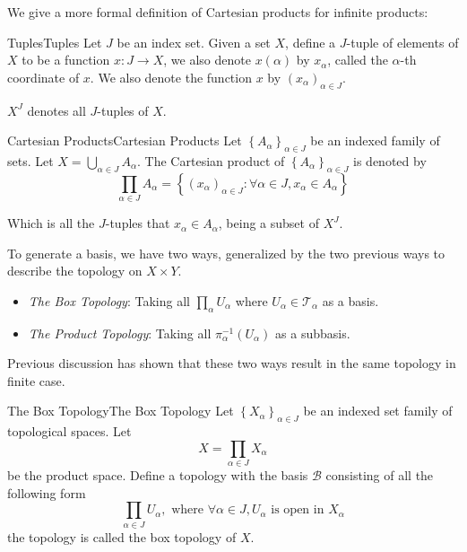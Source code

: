 \documentclass[../main.tex]{subfiles}
\begin{document}
We give a more formal definition of Cartesian products for infinite products:
\begin{definition}{Tuples}{Tuples}
Let $J$ be an index set. Given a set $X$, define a $J$-tuple of elements of $X$ to be a function $x:J \rightarrow X$, we also denote $x(\alpha)$ by $x_{\alpha}$, called the $\alpha$-th coordinate of $x$. We also denote the function $x$ by $(x_{\alpha}) _{\alpha\in J}$.

 $X^J$ denotes all $J$-tuples of $X$.
\end{definition}

\begin{definition}{Cartesian Products}{Cartesian Products}
Let $\left\{ A_{\alpha} \right\}_{\alpha\in J}$ be an indexed family of sets. Let $X = \bigcup_{\alpha\in J} A_{\alpha}$. The Cartesian product of $\left\{ A_{\alpha} \right\}_{\alpha\in J}$ is denoted by
\begin{equation*}
\prod_{\alpha\in J} A_{\alpha} = \left\{ (x_{\alpha})_{\alpha\in J} : \forall \alpha\in J, x_{\alpha}\in A_{\alpha} \right\}
\end{equation*}

Which is all the $J$-tuples that $x_{\alpha}\in A_{\alpha}$, being a subset of $X^J$.
\end{definition}

To generate a basis, we have two ways, generalized by the two previous ways to describe the topology on $X \times Y$.
\begin{itemize}
\item \emph{The Box Topology}: Taking all $\prod_{\alpha} U_{\alpha}$ where $U_{\alpha}\in \mathcal{T}_{\alpha}$ as a basis.
\item \emph{The Product Topology}: Taking all $\pi_{\alpha}^{-1}(U_{\alpha})$ as a subbasis.
\end{itemize}

Previous discussion has shown that these two ways result in the same topology in finite case.

\begin{definition}{The Box Topology}{The Box Topology}
Let $\left\{ X_{\alpha} \right\}_{\alpha\in J}$ be an indexed set family of topological spaces. Let
\begin{equation*}
X = \prod_{\alpha\in J}X_{\alpha}
\end{equation*}
be the product space. Define a topology with the basis $\mathcal{B}$ consisting of all the following form
\begin{equation*}
\prod_{\alpha\in J}U_{\alpha}, \text{ where }\forall \alpha\in J,U_{\alpha} \text{ is open in }X_{\alpha}
\end{equation*}
the topology is called the box topology of $X$.
\end{definition}
\end{document}
